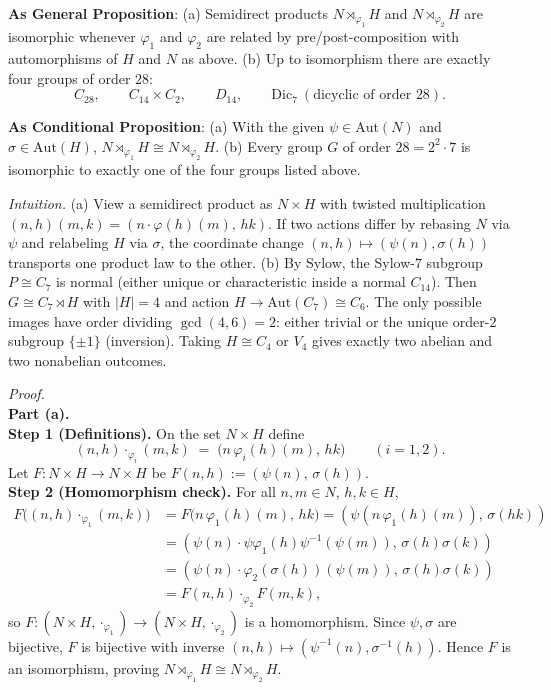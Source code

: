 \documentclass[11pt]{article}
\theoremstyle{definition}
\newcommand{\Aut}{\mathrm{Aut}}
\begin{document}
\noindent\textbf{As General Proposition}: (a) Semidirect products $N\rtimes_{\varphi_1} H$ and $N\rtimes_{\varphi_2} H$ are isomorphic whenever $\varphi_1$ and $\varphi_2$ are related by pre/post-composition with automorphisms of $H$ and $N$ as above. (b) Up to isomorphism there are exactly four groups of order $28$: 
\[
C_{28},\qquad C_{14}\times C_2,\qquad D_{14},\qquad \mathrm{Dic}_7\ (\text{dicyclic of order }28).
\]

\noindent \textbf{As Conditional Proposition}: (a) With the given $\psi\in\Aut(N)$ and $\sigma\in\Aut(H)$, $N\rtimes_{\varphi_1} H\cong N\rtimes_{\varphi_2} H$. (b) Every group $G$ of order $28=2^2\cdot 7$ is isomorphic to exactly one of the four groups listed above.

\newpage

\dotfill

\emph{Intuition.} (a) View a semidirect product as $N\times H$ with twisted multiplication $(n,h)(m,k)=(n\cdot \varphi(h)(m),\,hk)$. If two actions differ by rebasing $N$ via $\psi$ and relabeling $H$ via $\sigma$, the coordinate change $(n,h)\mapsto (\psi(n),\sigma(h))$ transports one product law to the other. (b) By Sylow, the Sylow-$7$ subgroup $P\cong C_7$ is normal (either unique or characteristic inside a normal $C_{14}$). Then $G\cong C_7\rtimes H$ with $|H|=4$ and action $H\to\Aut(C_7)\cong C_6$. The only possible images have order dividing $\gcd(4,6)=2$: either trivial or the unique order-$2$ subgroup $\{\pm1\}$ (inversion). Taking $H\cong C_4$ or $V_4$ gives exactly two abelian and two nonabelian outcomes.

\dotfill

\emph{Proof.}\\
\textbf{Part (a).}\\
\textbf{Step 1 (Definitions).} On the set $N\times H$ define
\[
(n,h)\cdot_{\varphi_i}(m,k)\;=\;\bigl(n\,\varphi_i(h)(m),\,hk\bigr)\qquad (i=1,2).
\]
Let $F:N\times H\to N\times H$ be $F(n,h):=(\psi(n),\,\sigma(h))$.\\

\textbf{Step 2 (Homomorphism check).} For all $n,m\in N$, $h,k\in H$,
\[
\begin{aligned}
F\big((n,h)\cdot_{\varphi_1}(m,k)\big)
&=F\big(n\,\varphi_1(h)(m),\,hk\big)
=(\psi(n\,\varphi_1(h)(m)),\,\sigma(hk))\\
&=(\psi(n)\cdot \psi\varphi_1(h)\psi^{-1}(\psi(m)),\,\sigma(h)\sigma(k))\\
&=(\psi(n)\cdot \varphi_2(\sigma(h))(\psi(m)),\,\sigma(h)\sigma(k))\\
&=F(n,h)\cdot_{\varphi_2} F(m,k),
\end{aligned}
\]
so $F:(N\times H, \cdot_{\varphi_1})\to (N\times H, \cdot_{\varphi_2})$ is a homomorphism. Since $\psi,\sigma$ are bijective, $F$ is bijective with inverse $(n,h)\mapsto (\psi^{-1}(n),\sigma^{-1}(h))$. Hence $F$ is an isomorphism, proving $N\rtimes_{\varphi_1} H\cong N\rtimes_{\varphi_2} H$.\\
\end{document}
